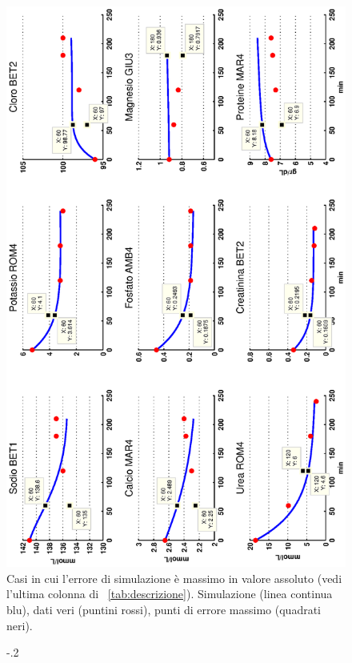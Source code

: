 \begin{description}
\begin{figure}[t]
		\includegraphics[angle=-90, width=1.4\textwidth]{immagini/casi_peggiori.eps}
		\caption{Casi in cui l'errore di simulazione è massimo in valore assoluto (vedi l'ultima colonna di \tablename~\ref{tab:descrizione}). Simulazione (linea continua blu), dati veri (puntini rossi), punti di errore massimo (quadrati neri).}\label{fig:worst}
\end{figure}
\begin{figure}[t]
	\centering
	\advance\leftskip-.2\textwidth

\end{figure}
\end{description}
